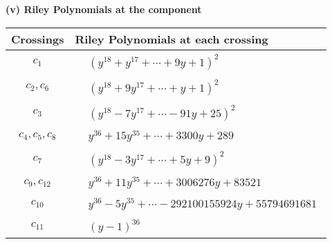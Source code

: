 \documentclass[1p]{elsarticle_modified}
\theoremstyle{definition}
\begin{document}
\newpage\renewcommand{\arraystretch}{1}
\flushleft \textbf{(v) Riley Polynomials at the component}\newline \\
\begin{tabular}{m{50pt}|m{274pt}}
Crossings & \hspace{64pt}Riley Polynomials at each crossing \\
\hline $$\begin{aligned}c_{1}\end{aligned}$$&$\begin{aligned}
&(y^{18}+y^{17}+\cdots+9 y+1)^{2}
\end{aligned}$\\
\hline $$\begin{aligned}c_{2},c_{6}\end{aligned}$$&$\begin{aligned}
&(y^{18}+9 y^{17}+\cdots+y+1)^{2}
\end{aligned}$\\
\hline $$\begin{aligned}c_{3}\end{aligned}$$&$\begin{aligned}
&(y^{18}-7 y^{17}+\cdots-91 y+25)^{2}
\end{aligned}$\\
\hline $$\begin{aligned}c_{4},c_{5},c_{8}\end{aligned}$$&$\begin{aligned}
&y^{36}+15 y^{35}+\cdots+3300 y+289
\end{aligned}$\\
\hline $$\begin{aligned}c_{7}\end{aligned}$$&$\begin{aligned}
&(y^{18}-3 y^{17}+\cdots+5 y+9)^{2}
\end{aligned}$\\
\hline $$\begin{aligned}c_{9},c_{12}\end{aligned}$$&$\begin{aligned}
&y^{36}+11 y^{35}+\cdots+3006276 y+83521
\end{aligned}$\\
\hline $$\begin{aligned}c_{10}\end{aligned}$$&$\begin{aligned}
&y^{36}-5 y^{35}+\cdots-292100155924 y+55794691681
\end{aligned}$\\
\hline $$\begin{aligned}c_{11}\end{aligned}$$&$\begin{aligned}
&(y-1)^{36}
\end{aligned}$\\
\hline
\end{tabular}\\~\\
\end{document}
